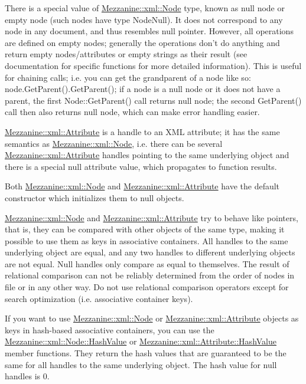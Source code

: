  There is a special value of \hyperlink{classMezzanine_1_1xml_1_1Node}{Mezzanine::xml::Node} type, known as null node or empty node (such nodes have type NodeNull). It does not correspond to any node in any document, and thus resembles null pointer. However, all operations are defined on empty nodes; generally the operations don't do anything and return empty nodes/attributes or empty strings as their result (see documentation for specific functions for more detailed information). This is useful for chaining calls; i.e. you can get the grandparent of a node like so: node.GetParent().GetParent(); if a node is a null node or it does not have a parent, the first Node::GetParent() call returns null node; the second GetParent() call then also returns null node, which can make error handling easier. \par
 \par
 \hyperlink{classMezzanine_1_1xml_1_1Attribute}{Mezzanine::xml::Attribute} is a handle to an XML attribute; it has the same semantics as \hyperlink{classMezzanine_1_1xml_1_1Node}{Mezzanine::xml::Node}, i.e. there can be several \hyperlink{classMezzanine_1_1xml_1_1Attribute}{Mezzanine::xml::Attribute} handles pointing to the same underlying object and there is a special null attribute value, which propagates to function results. \par
 \par
 Both \hyperlink{classMezzanine_1_1xml_1_1Node}{Mezzanine::xml::Node} and \hyperlink{classMezzanine_1_1xml_1_1Attribute}{Mezzanine::xml::Attribute} have the default constructor which initializes them to null objects. \par
 \par
 \hyperlink{classMezzanine_1_1xml_1_1Node}{Mezzanine::xml::Node} and \hyperlink{classMezzanine_1_1xml_1_1Attribute}{Mezzanine::xml::Attribute} try to behave like pointers, that is, they can be compared with other objects of the same type, making it possible to use them as keys in associative containers. All handles to the same underlying object are equal, and any two handles to different underlying objects are not equal. Null handles only compare as equal to themselves. The result of relational comparison can not be reliably determined from the order of nodes in file or in any other way. Do not use relational comparison operators except for search optimization (i.e. associative container keys). \par
 \par
 If you want to use \hyperlink{classMezzanine_1_1xml_1_1Node}{Mezzanine::xml::Node} or \hyperlink{classMezzanine_1_1xml_1_1Attribute}{Mezzanine::xml::Attribute} objects as keys in hash-\/based associative containers, you can use the \hyperlink{classMezzanine_1_1xml_1_1Node_a07e6ba623fc4def9da6ca3d1d861d8e9}{Mezzanine::xml::Node::HashValue} or \hyperlink{classMezzanine_1_1xml_1_1Attribute_ab7ddcd52f27d54683e4c6f29d4c54169}{Mezzanine::xml::Attribute::HashValue} member functions. They return the hash values that are guaranteed to be the same for all handles to the same underlying object. The hash value for null handles is 0. \par
